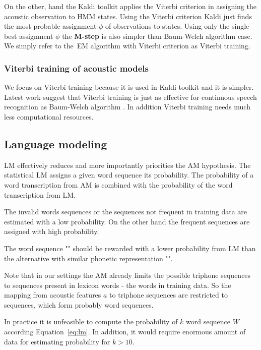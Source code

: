 {
On the other, hand the Kaldi toolkit applies the Viterbi 
criterion in assigning the acoustic observation to \ac{HMM} states.
Using the Viterbi criterion Kaldi just finds 
the most probable assignment $\phi$ of observations to states.\cite{buthpitiya2012parallel}
Using only the single best assignment $\phi$ the {\bf M-step} is also simpler than
Baum-Welch algorithm case.
We simply refer to the~\ac{EM} algorithm with Viterbi criterion as Viterbi training.

\subsubsection*{Viterbi training of acoustic models}
We focus on Viterbi training because it is used in Kaldi toolkit and it is simpler.
Latest work suggest that Viterbi training is just as effective for continuous
speech recognition as Baum-Welch algorithm \cite{rodriguez2003comparative}.
In addition Viterbi training needs much less computational resources. 


\subsection{Language modeling}
\label{sub:lm}

\ac{LM} effectively reduces and more importantly priorities the \ac{AM} hypothesis.
The statistical \ac{LM} assigns a given word sequence its probability.
The probability of a word transcription from \ac{AM} is combined with
the probability of the word transcription from \ac{LM}.

The invalid words sequences or the sequences not frequent in training data
are estimated with a low probability. On the other hand the frequent sequences
are assigned with high probability.

The word sequence "" should be rewarded 
with a lower probability from \ac{LM} than the alternative with similar phonetic representation
"".

Note that in our settings the \ac{AM} already limits the possible triphone
sequences to sequences present in lexicon words - the words in training data.
So the mapping from acoustic features $a$ to triphone sequences
are restricted to sequences, which form probably word sequences.

In practice it is unfeasible to compute the probability
of $k$ word sequence $W$ according Equation~\ref{eq:lm}.
In addition, it would require enormous amount of data for estimating
probability for $k>10$.


}

